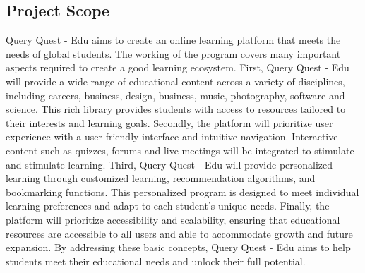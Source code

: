 \subsection{Project Scope}
Query Quest - Edu aims to create an online learning platform that meets the needs of global students. The working of the program covers many important aspects required to create a good learning ecosystem. First, Query Quest - Edu will provide a wide range of educational content across a variety of disciplines, including careers, business, design, business, music, photography, software and science. This rich library provides students with access to resources tailored to their interests and learning goals. Secondly, the platform will prioritize user experience with a user-friendly interface and intuitive navigation. Interactive content such as quizzes, forums and live meetings will be integrated to stimulate and stimulate learning. Third, Query Quest - Edu will provide personalized learning through customized learning, recommendation algorithms, and bookmarking functions. This personalized program is designed to meet individual learning preferences and adapt to each student's unique needs. Finally, the platform will prioritize accessibility and scalability, ensuring that educational resources are accessible to all users and able to accommodate growth and future expansion. By addressing these basic concepts, Query Quest - Edu aims to help students meet their educational needs and unlock their full potential.

\newpage








